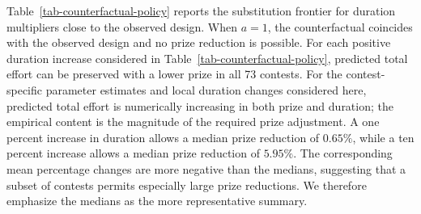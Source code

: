 \documentclass[mnsc]{informs3}
\begin{document}
Table~\ref{tab-counterfactual-policy} reports the substitution frontier for duration multipliers close to the observed design.
When $a=1$, the counterfactual coincides with the observed design and no prize reduction is possible.
For each positive duration increase considered in Table~\ref{tab-counterfactual-policy}, predicted total effort can be preserved with a lower prize in all 73 contests.
For the contest-specific parameter estimates and local duration changes considered here, predicted total effort is numerically increasing in both prize and duration; the empirical content is the magnitude of the required prize adjustment.
A one percent increase in duration allows a median prize reduction of $0.65\%$, while a ten percent increase allows a median prize reduction of $5.95\%$.
The corresponding mean percentage changes are more negative than the medians, suggesting that a subset of contests permits especially large prize reductions.
We therefore emphasize the medians as the more representative summary.
\end{document}
